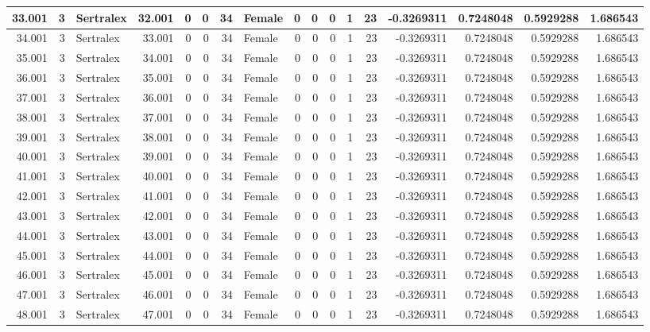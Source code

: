 \documentclass[
]{book}
\begin{document}
\begin{table}
\begin{tabular}[t]{r|r|l|r|r|r|r|l|r|r|r|r|r|r|r|r|r}
\hline
33.001 & 3 & Sertralex & 32.001 & 0 & 0 & 34 & Female & 0 & 0 & 0 & 1 & 23 & -0.3269311 & 0.7248048 & 0.5929288 & 1.686543\\
\hline
34.001 & 3 & Sertralex & 33.001 & 0 & 0 & 34 & Female & 0 & 0 & 0 & 1 & 23 & -0.3269311 & 0.7248048 & 0.5929288 & 1.686543\\
\hline
35.001 & 3 & Sertralex & 34.001 & 0 & 0 & 34 & Female & 0 & 0 & 0 & 1 & 23 & -0.3269311 & 0.7248048 & 0.5929288 & 1.686543\\
\hline
36.001 & 3 & Sertralex & 35.001 & 0 & 0 & 34 & Female & 0 & 0 & 0 & 1 & 23 & -0.3269311 & 0.7248048 & 0.5929288 & 1.686543\\
\hline
37.001 & 3 & Sertralex & 36.001 & 0 & 0 & 34 & Female & 0 & 0 & 0 & 1 & 23 & -0.3269311 & 0.7248048 & 0.5929288 & 1.686543\\
\hline
38.001 & 3 & Sertralex & 37.001 & 0 & 0 & 34 & Female & 0 & 0 & 0 & 1 & 23 & -0.3269311 & 0.7248048 & 0.5929288 & 1.686543\\
\hline
39.001 & 3 & Sertralex & 38.001 & 0 & 0 & 34 & Female & 0 & 0 & 0 & 1 & 23 & -0.3269311 & 0.7248048 & 0.5929288 & 1.686543\\
\hline
40.001 & 3 & Sertralex & 39.001 & 0 & 0 & 34 & Female & 0 & 0 & 0 & 1 & 23 & -0.3269311 & 0.7248048 & 0.5929288 & 1.686543\\
\hline
41.001 & 3 & Sertralex & 40.001 & 0 & 0 & 34 & Female & 0 & 0 & 0 & 1 & 23 & -0.3269311 & 0.7248048 & 0.5929288 & 1.686543\\
\hline
42.001 & 3 & Sertralex & 41.001 & 0 & 0 & 34 & Female & 0 & 0 & 0 & 1 & 23 & -0.3269311 & 0.7248048 & 0.5929288 & 1.686543\\
\hline
43.001 & 3 & Sertralex & 42.001 & 0 & 0 & 34 & Female & 0 & 0 & 0 & 1 & 23 & -0.3269311 & 0.7248048 & 0.5929288 & 1.686543\\
\hline
44.001 & 3 & Sertralex & 43.001 & 0 & 0 & 34 & Female & 0 & 0 & 0 & 1 & 23 & -0.3269311 & 0.7248048 & 0.5929288 & 1.686543\\
\hline
45.001 & 3 & Sertralex & 44.001 & 0 & 0 & 34 & Female & 0 & 0 & 0 & 1 & 23 & -0.3269311 & 0.7248048 & 0.5929288 & 1.686543\\
\hline
46.001 & 3 & Sertralex & 45.001 & 0 & 0 & 34 & Female & 0 & 0 & 0 & 1 & 23 & -0.3269311 & 0.7248048 & 0.5929288 & 1.686543\\
\hline
47.001 & 3 & Sertralex & 46.001 & 0 & 0 & 34 & Female & 0 & 0 & 0 & 1 & 23 & -0.3269311 & 0.7248048 & 0.5929288 & 1.686543\\
\hline
48.001 & 3 & Sertralex & 47.001 & 0 & 0 & 34 & Female & 0 & 0 & 0 & 1 & 23 & -0.3269311 & 0.7248048 & 0.5929288 & 1.686543\\

\end{tabular}
\end{table}
\end{document}
